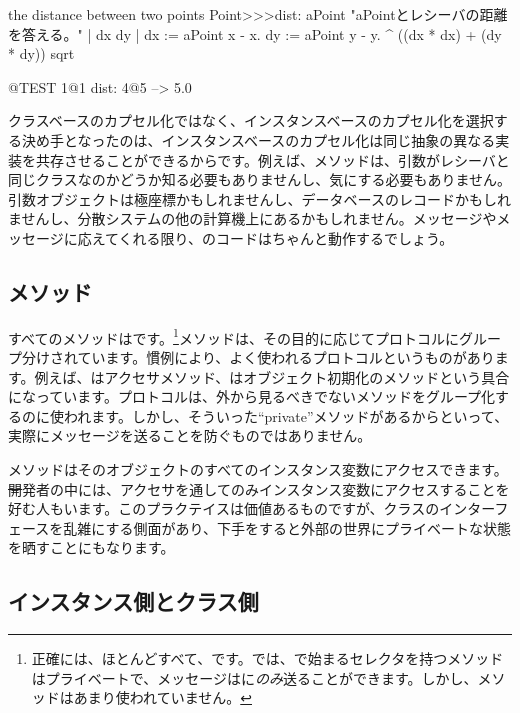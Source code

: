 \documentclass[a4paper,10pt,twoside]{book}
\begin{document}
\begin{method}[dist:]{the distance between two points}
Point>>>dist: aPoint 
	"aPointとレシーバの距離を答える。"  
	| dx dy |
	dx := aPoint x - x.
	dy :=  aPoint y - y.
	^ ((dx * dx) + (dy * dy)) sqrt
\end{method}

\begin{code}{@TEST}
1@1 dist: 4@5 --> 5.0
\end{code}

クラスベースのカプセル化ではなく、インスタンスベースのカプセル化を選択する決め手となったのは、インスタンスベースのカプセル化は同じ抽象の異なる実装を共存させることができるからです。例えば、メソッドは、引数がレシーバと同じクラスなのかどうか知る必要もありませんし、気にする必要もありません。引数オブジェクトは極座標かもしれませんし、データベースのレコードかもしれませんし、分散システムの他の計算機上にあるかもしれません。メッセージやメッセージに応えてくれる限り、のコードはちゃんと動作するでしょう。

\subsection{メソッド}

すべてのメソッドはです。\footnote{正確には、ほとんどすべて、です。\pharo では、で始まるセレクタを持つメソッドはプライベートで、メッセージは\self に\emph{のみ}送ることができます。しかし、メソッドはあまり使われていません。}メソッドは、その目的に応じてプロトコルにグループ分けされています。慣例により、よく使われるプロトコルというものがあります。例えば、はアクセサメソッド、はオブジェクト初期化のメソッドという具合になっています。プロトコルは、外から見るべきでないメソッドをグループ化するのに使われます。しかし、そういった``private''メソッドがあるからといって、実際にメッセージを送ることを防ぐものではありません。

メソッドはそのオブジェクトのすべてのインスタンス変数にアクセスできます。\st 開発者の中には、アクセサを通してのみインスタンス変数にアクセスすることを好む人もいます。このプラクテイスは価値あるものですが、クラスのインターフェースを乱雑にする側面があり、下手をすると外部の世界にプライベートな状態を晒すことにもなります。

\subsection{インスタンス側とクラス側}
\end{document}
